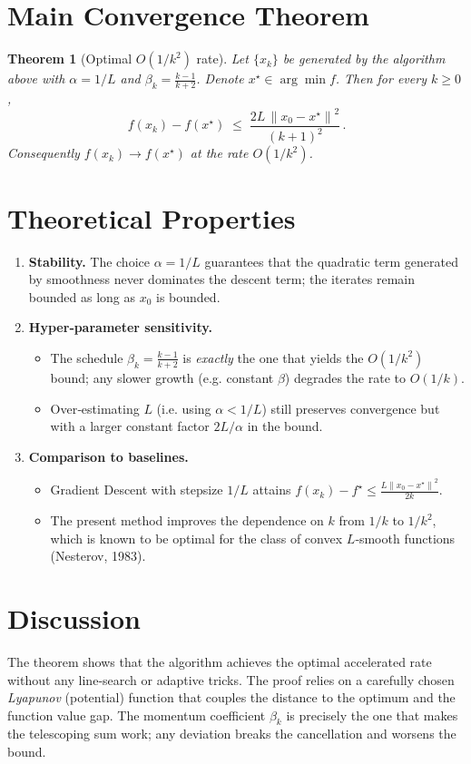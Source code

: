 \documentclass{article}
\newtheorem{theorem}{Theorem}
\newcommand{\norm}[1]{\left\lVert#1\right\rVert}
\begin{document}
\section*{Main Convergence Theorem}
\begin{theorem}[Optimal $O(1/k^2)$ rate]\label{thm:rate}
Let $\{x_k\}$ be generated by the algorithm above with $\alpha=1/L$ and $\beta_k=\frac{k-1}{k+2}$.
Denote $x^\star\in\arg\min f$. Then for every $k\ge 0$,
\[
\boxed{\,f(x_k)-f(x^\star)\;\le\; \frac{2L\,\norm{x_0-x^\star}^2}{(k+1)^2}\, }.
\]
Consequently $f(x_k)\to f(x^\star)$ at the rate $O(1/k^2)$.
\end{theorem}

\section*{Theoretical Properties}
\begin{enumerate}[label=\arabic*.]
\item \textbf{Stability.} The choice $\alpha=1/L$ guarantees that the quadratic term generated by smoothness never dominates the descent term; the iterates remain bounded as long as $x_0$ is bounded.
\item \textbf{Hyper‑parameter sensitivity.}
\begin{itemize}
\item The schedule $\beta_k=\frac{k-1}{k+2}$ is \emph{exactly} the one that yields the $O(1/k^2)$ bound; any slower growth (e.g. constant $\beta$) degrades the rate to $O(1/k)$.
\item Over‑estimating $L$ (i.e. using $\alpha<1/L$) still preserves convergence but with a larger constant factor $2L/\alpha$ in the bound.
\end{itemize}
\item \textbf{Comparison to baselines.}
\begin{itemize}
\item Gradient Descent with stepsize $1/L$ attains $f(x_k)-f^\star\le \frac{L\norm{x_0-x^\star}^2}{2k}$.
\item The present method improves the dependence on $k$ from $1/k$ to $1/k^2$, which is known to be optimal for the class of convex $L$‑smooth functions (Nesterov, 1983).
\end{itemize}
\end{enumerate}

\section*{Discussion}
The theorem shows that the algorithm achieves the optimal accelerated rate without any line‑search or adaptive tricks. The proof relies on a carefully chosen \emph{Lyapunov} (potential) function that couples the distance to the optimum and the function value gap. The momentum coefficient $\beta_k$ is precisely the one that makes the telescoping sum work; any deviation breaks the cancellation and worsens the bound.
\end{document}

